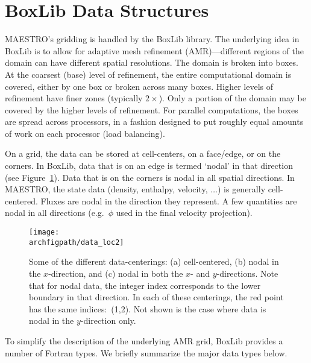 \section{BoxLib Data Structures}

MAESTRO's gridding is handled by the BoxLib library.  The underlying
idea in BoxLib is to allow for adaptive mesh refinement (AMR)---different
regions of the domain can have different spatial resolutions.  The
domain is broken into boxes.  At the coarsest (base) level of
refinement, the entire computational domain is covered, either by one
box or broken across many boxes.  Higher levels of refinement have
finer zones (typically $2\times$).  Only a portion of the domain may
be covered by the higher levels of refinement.  
For parallel computations, the boxes are spread across processors, in
a fashion designed to put roughly equal amounts of work on each
processor (load balancing).

On a grid, the data can be stored at cell-centers, on a face/edge, or
on the corners.  In BoxLib, data that is on an edge is termed `nodal'
in that direction (see Figure~\ref{fig:dataloc}).  Data that is on the
corners is nodal in all spatial directions.  In MAESTRO, the state
data (density, enthalpy, velocity, $\ldots$) is generally
cell-centered.  Fluxes are nodal in the direction they represent.
A few quantities are nodal in all directions (e.g.\ $\phi$ used in
the final velocity projection).

\begin{figure}[h]
\centering
\texttt{[image: \\archfigpath/data\_loc2]}
\caption[Data-centerings on the grid]
  {\label{fig:dataloc} Some of the different data-centerings:
  (a) cell-centered, (b) nodal in the $x$-direction, and (c) nodal in
  both the $x$- and $y$-directions.  Note that for nodal data, the
  integer index corresponds to the lower boundary in that direction.
  In each of these centerings, the red point has the same indices:\ (1,2).
  Not shown is the case where data is nodal in the $y$-direction only.}
\end{figure}



To simplify the description of the underlying AMR grid, BoxLib
provides a number of Fortran types.  We briefly summarize the major
data types below.


\subsection{\boxtype}

